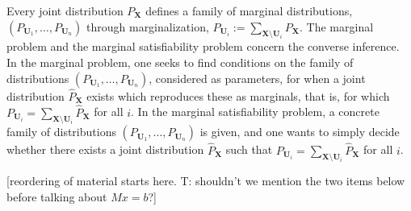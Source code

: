 \documentclass[aps,english,superscriptaddress,onecolumn,twoside,longbibliography,pra,floatfix,fleqn,nofootinbib]{revtex4-1}%
\theoremstyle{definition}
\begin{document}
Every joint distribution $P_{\bm{X}}$ %
defines a family of marginal distributions, $(P_{\bm{U}_1},\ldots,P_{\bm{U}_n})$ through marginalization,  $P_{\bm{U}_i} := \sum_{\bm{X} \setminus \bm{U}_i} P_{\bm{X}}$.  
 The marginal problem and the marginal satisfiability problem concern 
 the converse inference.  
In the marginal problem, one seeks to find conditions on the family of distributions $(P_{\bm{U}_1},\ldots,P_{\bm{U}_n})$, considered as parameters, for when a joint distribution $\hat{P}_{\bm{X}}$ exists which reproduces these as marginals, that is, for which $P_{\bm{U}_i} = \sum_{\bm{X}\setminus\bm{U}_i} \hat{P}_{\bm{X}}$ for all $i$.
In the marginal satisfiability problem, a concrete family of distributions $(P_{\bm{U}_1},\ldots,P_{\bm{U}_n})$ is given, and one wants to simply decide whether there exists a joint distribution $\hat{P}_{\bm{X}}$ such that $P_{\bm{U}_i} = \sum_{\bm{X}\setminus\bm{U}_i} \hat{P}_{\bm{X}}$ for all $i$.

  
  \color{blue} [reordering of material starts here. T: shouldn't we mention the two items below before talking about $Mx=b$?]\color{black}
  
\end{document}
